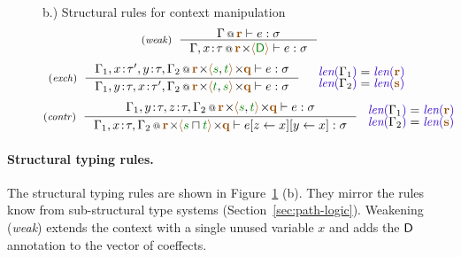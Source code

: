 \begin{figure}[t]
{\small b.) Structural rules for context manipulation}
\begin{equation*}
\tyrule{weak}
  {\coctx{\Gamma}{ \aclrd{\textbf{r}} } \vdash e : \sigma}
  {\coctx{\Gamma,x \!:\! \tau}{\aclrd{\textbf{r}} \cons \alift{ \cclrd{\ident{D}} }} \vdash e : \sigma} 
\end{equation*}
\begin{equation*}
\tyrule{exch}
  {\coctx{\Gamma_1,x\!:\!\tau',y\!:\!\tau,\Gamma_2}{\aclrd{\textbf{r}} \cons\alift{\cclrd{s},\cclrd{t}} \cons \aclrd{\textbf{q}}} \vdash e : \sigma}
  {\coctx{\Gamma_1,y\!:\!\tau,x\!:\!\tau',\Gamma_2}{\aclrd{\textbf{r}} \cons\alift{\cclrd{t},\cclrd{s}} \cons \aclrd{\textbf{q}}} \vdash e : \sigma}
\quad
\begin{array}{l}
\slen{\Gamma_1} = \slen{\aclrd{\textbf{r}}}\\[-0.25em]
\slen{\Gamma_2} = \slen{\aclrd{\textbf{s}}}
\end{array}
\end{equation*}
\begin{equation*}
\tyrule{contr}
  {\coctx{\Gamma_1,y\!:\!\tau,z\!:\!\tau,\Gamma_2}{\aclrd{\textbf{r}} \cons \alift{\cclrd{s},\cclrd{t}} \cons \aclrd{\textbf{q}}} \vdash e : \sigma}
  {\coctx{\Gamma_1,x\!:\!\tau,\Gamma_2}{\aclrd{\textbf{r}} \cons \alift{\cclrd{s}\sqcap\cclrd{t}} \cons \aclrd{\textbf{q}}} \vdash \subst{\subst{e}{z}{x}}{y}{x} : \sigma}
~
\begin{array}{l}
\slen{\Gamma_1} = \slen{\aclrd{\textbf{r}}}\\[-0.25em]
\slen{\Gamma_2} = \slen{\aclrd{\textbf{s}}}
\end{array}
\end{equation*}

\label{fig:applications-struct-live}
\vspace{-1em}
\end{figure}


\paragraph{Structural typing rules.}
The structural typing rules are shown in Figure~\ref{fig:applications-struct-live} (b). They mirror
the rules know from sub-structural type systems (Section~\ref{sec:path-logic}). Weakening (\emph{weak})
extends the context with a single unused variable $x$ and adds the $\textnormal{\sffamily D}$ annotation to the
vector of coeffects.

